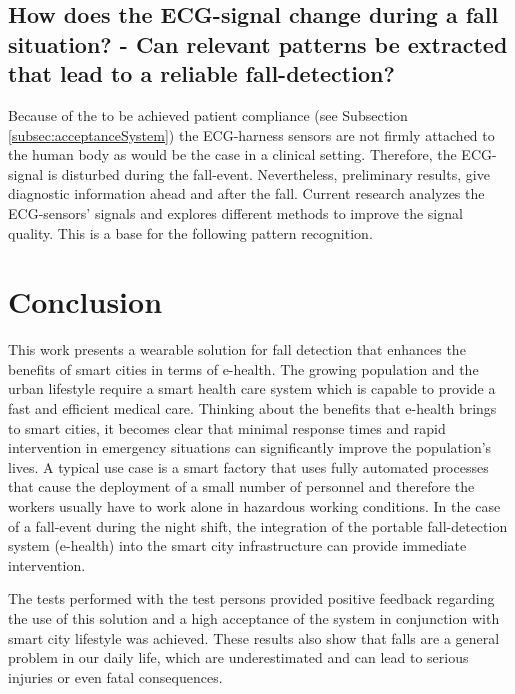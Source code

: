 \documentclass[review]{elsarticle}
\begin{document}
 
\subsection{How does the ECG-signal change during a fall situation? - Can relevant patterns be extracted that lead to a reliable fall-detection?}
\label{subsec:ECGPattern}
Because of the to be achieved patient compliance (see Subsection \ref{subsec:acceptanceSystem}) the ECG-harness sensors are not firmly attached to the human body as would be the case in a clinical setting. Therefore, the ECG-signal is disturbed during the fall-event. Nevertheless, preliminary results, give diagnostic information ahead and after the fall. Current research analyzes the ECG-sensors' signals and explores different methods to improve the signal quality.  This is a base for the following pattern recognition.	
  

\section{Conclusion}
\label{sec:conclusion}
This work presents a wearable solution for fall detection that enhances the benefits of smart cities in terms of e-health. The growing population and the urban lifestyle require a smart health care system which is capable to provide a fast and efficient medical care. Thinking about the benefits that e-health brings to smart cities, it becomes clear that minimal response times and rapid intervention in emergency situations can significantly improve the population's lives. A typical use case is a smart factory that uses fully automated processes that cause the deployment of a small number of personnel and therefore the workers usually have to work alone in hazardous working conditions. In the case of a fall-event during the night shift, the integration of the portable fall-detection system (e-health) into the smart city infrastructure can provide immediate intervention. 

The tests performed with the test persons provided positive feedback regarding the use of this solution and a high acceptance of the system in conjunction with smart city lifestyle was achieved. These results also show that falls are a general problem in our daily life, which are underestimated and can lead to serious injuries or even fatal consequences. 
\end{document}
